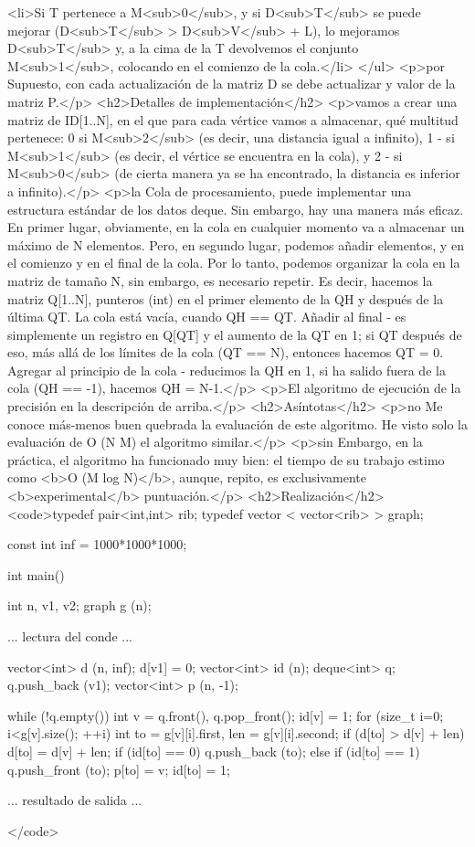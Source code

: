 <li>Si T pertenece a M<sub>0</sub>, y si D<sub>T</sub> se puede mejorar (D<sub>T</sub> > D<sub>V</sub> + L), lo mejoramos D<sub>T</sub> y, a la cima de la T devolvemos el conjunto M<sub>1</sub>, colocando en el comienzo de la cola.</li>
</ul>
<p>por Supuesto, con cada actualización de la matriz D se debe actualizar y valor de la matriz P.</p>
<h2>Detalles de implementación</h2>
<p>vamos a crear una matriz de ID[1..N], en el que para cada vértice vamos a almacenar, qué multitud pertenece: 0 si M<sub>2</sub> (es decir, una distancia igual a infinito), 1 - si M<sub>1</sub> (es decir, el vértice se encuentra en la cola), y 2 - si M<sub>0</sub> (de cierta manera ya se ha encontrado, la distancia es inferior a infinito).</p>
<p>la Cola de procesamiento, puede implementar una estructura estándar de los datos deque. Sin embargo, hay una manera más eficaz. En primer lugar, obviamente, en la cola en cualquier momento va a almacenar un máximo de N elementos. Pero, en segundo lugar, podemos añadir elementos, y en el comienzo y en el final de la cola. Por lo tanto, podemos organizar la cola en la matriz de tamaño N, sin embargo, es necesario repetir. Es decir, hacemos la matriz Q[1..N], punteros (int) en el primer elemento de la QH y después de la última QT. La cola está vacía, cuando QH == QT. Añadir al final - es simplemente un registro en Q[QT] y el aumento de la QT en 1; si QT después de eso, más allá de los límites de la cola (QT == N), entonces hacemos QT = 0. Agregar al principio de la cola - reducimos la QH en 1, si ha salido fuera de la cola (QH == -1), hacemos QH = N-1.</p>
<p>El algoritmo de ejecución de la precisión en la descripción de arriba.</p>
<h2>Asíntotas</h2>
<p>no Me conoce más-menos buen quebrada la evaluación de este algoritmo. He visto solo la evaluación de O (N M) el algoritmo similar.</p>
<p>sin Embargo, en la práctica, el algoritmo ha funcionado muy bien: el tiempo de su trabajo estimo como <b>O (M log N)</b>, aunque, repito, es exclusivamente <b>experimental</b> puntuación.</p>
<h2>Realización</h2>
<code>typedef pair<int,int> rib;
typedef vector < vector<rib> > graph;

const int inf = 1000*1000*1000;


int main()
{
int n, v1, v2;
graph g (n);

... lectura del conde ...

vector<int> d (n, inf);
d[v1] = 0;
vector<int> id (n);
deque<int> q;
q.push_back (v1);
vector<int> p (n, -1);

while (!q.empty())
{
int v = q.front(), q.pop_front();
id[v] = 1;
for (size_t i=0; i<g[v].size(); ++i)
{
int to = g[v][i].first, len = g[v][i].second;
if (d[to] > d[v] + len)
{
d[to] = d[v] + len;
if (id[to] == 0)
q.push_back (to);
else if (id[to] == 1)
q.push_front (to);
p[to] = v;
id[to] = 1;
}
}
}

... resultado de salida ...

}</code>
